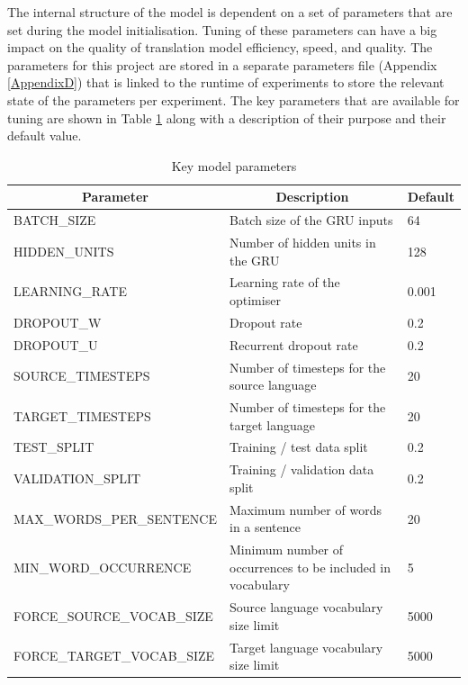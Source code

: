 The internal structure of the model is dependent on a set of parameters that are set during the model initialisation. 
Tuning of these parameters can have a big impact on the quality of translation model efficiency, speed, and quality. The parameters for this project are stored in a separate parameters file (Appendix \ref{AppendixD}) that is linked to the runtime of experiments to store the relevant state of the parameters per experiment. The key parameters that are available for tuning are shown in Table \ref{tab:model-parameters} along with a description of their purpose and their default value.


\begin{table}[!ht]
\centering
\small
\begin{tabular}{|l|p{6.6cm}|l|}
\hline
\multicolumn{1}{|c|}{\textbf{Parameter}} & \multicolumn{1}{c|}{\textbf{Description}}                                       & \textbf{Default} \\ \hline
BATCH\_SIZE                & Batch size of the \acrshort{GRU} inputs            & 64    \\ \hline
HIDDEN\_UNITS              & Number of hidden units in the \acrshort{GRU}       & 128   \\ \hline
LEARNING\_RATE             & Learning rate of the optimiser                     & 0.001 \\ \hline
DROPOUT\_W                 & Dropout rate                                       & 0.2   \\ \hline
DROPOUT\_U                 & Recurrent dropout rate                             & 0.2   \\ \hline
SOURCE\_TIMESTEPS          & Number of timesteps for the source language        & 20    \\ \hline
TARGET\_TIMESTEPS          & Number of timesteps for the target language        & 20    \\ \hline
TEST\_SPLIT                & Training / test data split                         & 0.2   \\ \hline
VALIDATION\_SPLIT          & Training / validation data split                   & 0.2   \\ \hline
MAX\_WORDS\_PER\_SENTENCE  & Maximum number of words in a sentence              & 20    \\ \hline
MIN\_WORD\_OCCURRENCE      & Minimum number of occurrences to be included in vocabulary & 5 \\ \hline
FORCE\_SOURCE\_VOCAB\_SIZE & Source language vocabulary size limit              & 5000 \\ \hline
FORCE\_TARGET\_VOCAB\_SIZE & Target language vocabulary size limit              & 5000 \\ \hline
\end{tabular}
\captionsetup{justification=centering}
\caption{Key model parameters}
\label{tab:model-parameters}
\end{table}


